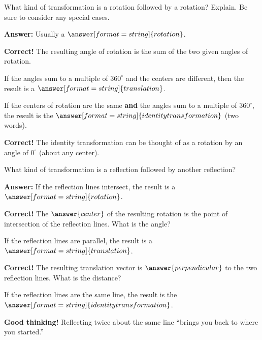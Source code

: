 \documentclass[nooutcomes]{ximera}
\begin{document}
\begin{question}
What kind of transformation is a rotation followed by a rotation?  Explain.  Be sure to consider any special cases.   

\textbf{Answer:} Usually a $\answer[format=string]{rotation}$.  
\begin{feedback}[correct]
\textbf{Correct!} The resulting angle of rotation is the sum of the two given angles of rotation.  
\end{feedback}
\begin{question}
If the angles sum to a multiple of $360^\circ$ and the centers are different, then the result is a $\answer[format=string]{translation}$.  
\begin{question}
If the centers of rotation are the same \textbf{and} the angles sum to a multiple of $360^\circ$, the result is the $\answer[format=string]{identity transformation}$ (two words).  
\begin{feedback}[correct]
\textbf{Correct!} The identity transformation can be thought of as a rotation by an angle of $0^\circ$ (about any center).
\end{feedback}
\end{question}
\end{question}
\end{question}

\begin{question}
What kind of transformation is a reflection followed by another reflection?    

\textbf{Answer:} If the reflection lines intersect, the result is a $\answer[format=string]{rotation}$.  
\begin{feedback}[correct]
\textbf{Correct!} The $\answer{center}$ of the resulting rotation is the point of intersection of the reflection lines.  What is the angle?
\end{feedback}
\begin{question}
If the reflection lines are parallel, the result is a $\answer[format=string]{translation}$. 
\begin{feedback}[correct]
\textbf{Correct!} The resulting translation vector is $\answer{perpendicular}$ to the two reflection lines. What is the distance?
\end{feedback}
\begin{question}
If the reflection lines are the same line, the result is the $\answer[format=string]{identity transformation}$.
\begin{feedback}[correct]
\textbf{Good thinking!} Reflecting twice about the same line ``brings you back to where you started.'' 
\end{feedback}
\end{question}
\end{question}
\end{question}
\end{document}
